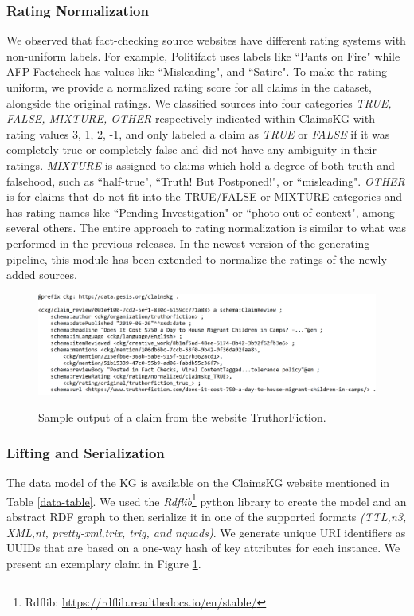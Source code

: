\documentclass[
]{ceurart}
\begin{document}
\subsubsection{\textbf{Rating Normalization}} 
\vspace{-1mm}
We observed that fact-checking source websites have different rating systems with non-uniform labels. For example, Politifact uses labels like ``Pants on Fire"  while AFP Factcheck has values like ``Misleading", and ``Satire". To make the rating uniform, we provide a normalized rating score for all claims in the dataset, alongside the original ratings. We classified sources into four categories \textit{TRUE, FALSE, MIXTURE, OTHER} respectively indicated  within ClaimsKG with rating values 3, 1, 2, -1, and only labeled a claim as \textit{TRUE} or \textit{FALSE} if it was completely true or completely false and did not have any ambiguity in their ratings. \textit{MIXTURE} is assigned to claims which hold a degree of both truth and falsehood, such as ``half-true", ``Truth! But Postponed!", or ``misleading". \textit{OTHER} is for claims that do not fit into the TRUE/FALSE or MIXTURE categories and has rating names like ``Pending Investigation" or ``photo out of context", among several others. The entire approach to rating normalization is similar to what was performed in the previous releases. In the newest version of the generating pipeline, this module has been extended to normalize the ratings of the newly added sources. %

\begin{figure}[ht]
\centering
\caption{Sample output of a claim from the website TruthorFiction.}
\includegraphics[width=0.75\linewidth]{output.PNG}
\vspace{-4mm}
\label{output_figure}
\end{figure}

\vspace{-2mm}
\subsubsection{\textbf{Lifting and Serialization}} 
The data model of the KG is available on the ClaimsKG website mentioned in Table \ref{data-table}.  We used the \textit{Rdflib}\footnote{Rdflib: \url{https://rdflib.readthedocs.io/en/stable/}} python library to create the model and an abstract RDF graph to then serialize it in
one of the supported formats\textit{ (TTL,n3, XML,nt, pretty-xml,trix, trig, and nquads)}. We generate unique URI identifiers as UUIDs that are
based on a one-way hash of key attributes for each instance. We present an exemplary claim in Figure \ref{output_figure}. %
\vspace{-4mm}
\end{document}
